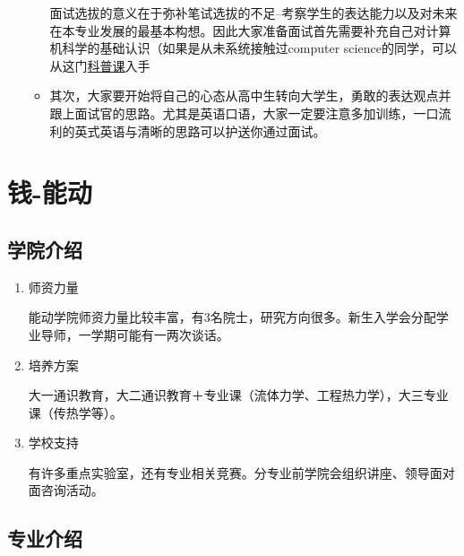 \documentclass[zihao=-4,fontset=none]{Beautybook-CN}
\begin{document}
\begin{enumerate}
\begin{itemize}
	      	      面试选拔的意义在于弥补笔试选拔的不足--考察学生的表达能力以及对未来在本专业发展的最基本构想。因此大家准备面试首先需要补充自己对计算机科学的基础认识（如果是从未系统接触过computer science的同学，可以从这门\href{https://www.bilibili.com/video/BV1EW411u7th/}{科普课}入手
	      	      	      	              
	      	\item 其次，大家要开始将自己的心态从高中生转向大学生，勇敢的表达观点并跟上面试官的思路。尤其是英语口语，大家一定要注意多加训练，一口流利的英式英语与清晰的思路可以护送你通过面试。
	      \end{itemize}
\end{enumerate}
\section{钱-能动}

\subsection{学院介绍}

\begin{enumerate}
	\item 师资力量
	      	      	          
	      能动学院师资力量比较丰富，有3名院士，研究方向很多。新生入学会分配学业导师，一学期可能有一两次谈话。
	      	      	          
	\item 培养方案
	      	      	          
	      大一通识教育，大二通识教育＋专业课（流体力学、工程热力学），大三专业课（传热学等）。
	      	      
	      	      	          
	\item 学校支持
	      	      
	      有许多重点实验室，还有专业相关竞赛。分专业前学院会组织讲座、领导面对面咨询活动。
\end{enumerate}

\subsection{专业介绍}
\end{document}
